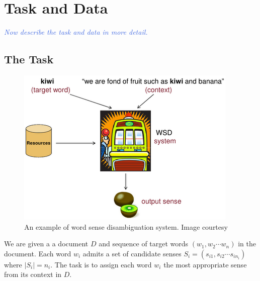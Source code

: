 \documentclass[11pt,letterpaper]{article}
\newcommand{\blue}[1]{\textcolor{RoyalBlue}{#1}}
\newcommand{\instructions}[1]{\blue{\textit{#1}}}
\begin{document}
\section{Task and Data}
\label{sec:taskAndData}
\instructions{Now describe the task and data in more detail.}

\subsection{The Task}
\label{sec:task}
\begin{figure}[!htbp]
\centering
\includegraphics[scale=0.8]{wsd.png}
\caption{An example of word sense disambiguation system. Image courtesy ~\protect\cite{navilgiblog}}
\end{figure}
We are given a a document $D$ and sequence of target words $(w_1,w_2 \cdots w_n)$ in the document. Each word $w_i$ admits a set of candidate senses $S_i=(s_{i1},s_{i2} \cdots s_{in_i})$ where $|S_i|= n_i$. The task is to assign each word $w_i$ the most appropriate sense from its context in $D$. 
\end{document}
